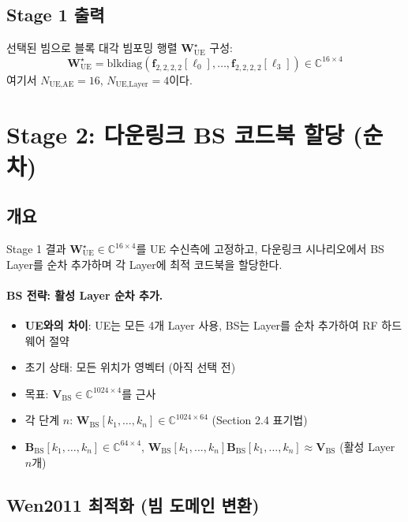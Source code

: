 \documentclass[10pt]{article}
\begin{document}
\subsection{Stage 1 출력}

선택된 빔으로 블록 대각 빔포밍 행렬 $\mathbf{W}_{\text{UE}}^{\star}$ 구성:
\begin{equation}
\mathbf{W}_{\text{UE}}^{\star} = \text{blkdiag}(\mathbf{f}_{2,2,2,2}[\ell_0], \ldots, \mathbf{f}_{2,2,2,2}[\ell_3]) \in \mathbb{C}^{16 \times 4}
\end{equation}
여기서 $N_{\text{UE,AE}} = 16$, $N_{\text{UE,Layer}} = 4$이다.

\section{Stage 2: 다운링크 BS 코드북 할당 (순차)}

\subsection{개요}

Stage 1 결과 $\mathbf{W}_{\text{UE}}^{\star} \in \mathbb{C}^{16 \times 4}$를 UE 수신측에 고정하고, 다운링크 시나리오에서 BS Layer를 순차 추가하며 각 Layer에 최적 코드북을 할당한다.

\paragraph{BS 전략: 활성 Layer 순차 추가.}
\begin{itemize}
    \item \textbf{UE와의 차이}: UE는 모든 4개 Layer 사용, BS는 Layer를 순차 추가하여 RF 하드웨어 절약
    \item 초기 상태: 모든 위치가 영벡터 (아직 선택 전)
    \item 목표: $\mathbf{V}_{\text{BS}} \in \mathbb{C}^{1024 \times 4}$를 근사
    \item 각 단계 $n$: $\mathbf{W}_{\text{BS}}[k_1, \ldots, k_n] \in \mathbb{C}^{1024 \times 64}$ (Section 2.4 표기법)
    \item $\mathbf{B}_{\text{BS}}[k_1, \ldots, k_n] \in \mathbb{C}^{64 \times 4}$, $\mathbf{W}_{\text{BS}}[k_1, \ldots, k_n] \mathbf{B}_{\text{BS}}[k_1, \ldots, k_n] \approx \mathbf{V}_{\text{BS}}$ (활성 Layer $n$개)
\end{itemize}

\subsection{Wen2011 최적화 (빔 도메인 변환)}
\end{document}
